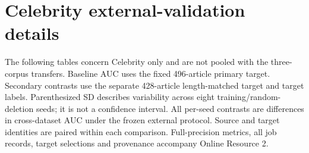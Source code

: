\FloatBarrier
\section{Celebrity external-validation details}\label{sec:external_appendix}
The following tables concern Celebrity only and are not pooled with the three-corpus transfers. Baseline AUC uses the fixed 496-article primary target. Secondary contrasts use the separate 428-article length-matched target and target labels. Parenthesized SD describes variability across eight training/random-deletion seeds; it is not a confidence interval. All per-seed contrasts are differences in cross-dataset AUC under the frozen external protocol. Source and target identities are paired within each comparison. Full-precision metrics, all job records, target selections and provenance accompany Online Resource 2.

\begin{table}[htbp]
\caption{Celebrity baseline (C0) cross-dataset AUC: mean (sample SD) across eight seeds on the 496-article target.}\label{tab:celebrity_baselines}
\centering\footnotesize{}
\end{table}

\begin{table}[htbp]
\caption{Celebrity secondary diagnostics on the 428-article length-matched target: mean AUC difference (sample SD) across eight seeds. Positive favors masking over the matched length-plus-random-deletion control. No comparison with the primary target is implied.}\label{tab:celebrity_secondary}
\centering\footnotesize{}
\end{table}

\begin{table}[htbp]
\caption{Celebrity TF-IDF per-seed AUC contrasts by training source. First two contrasts: primary (496 articles); last two: secondary (428 articles). Residual: WELFake residual.}
\centering\scriptsize{}
\end{table}

\begin{table}[htbp]
\caption{Celebrity DistilBERT per-seed AUC contrasts by training source. First two contrasts: primary (496 articles); last two: secondary (428 articles).}
\centering\scriptsize{}
\end{table}

\begin{table}[htbp]
\caption{Celebrity RoBERTa per-seed AUC contrasts by training source. First two contrasts: primary (496 articles); last two: secondary (428 articles). No article-level sampling intervals are estimated.}
\centering\scriptsize{}
\end{table}
\FloatBarrier
